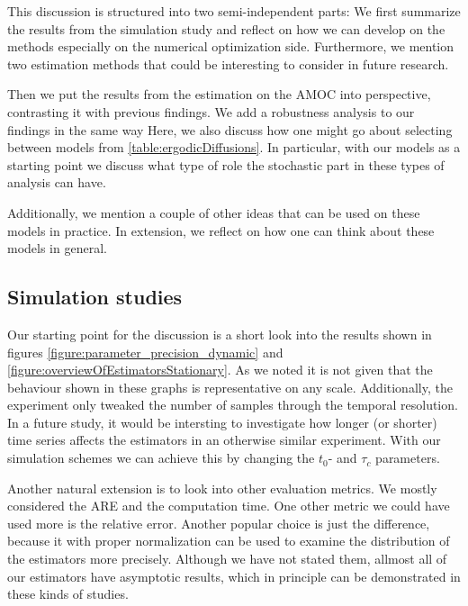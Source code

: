 This discussion is structured into two semi-independent parts: We first summarize the results from the simulation study and reflect on how we can develop on the methods especially on the numerical optimization side. Furthermore, we mention two estimation methods that could be interesting to consider in future research.

Then we put the results from the estimation on the AMOC into perspective, contrasting it with previous findings. We add a robustness analysis to our findings in the same way  Here, we also discuss how one might go about selecting between models from \ref{table:ergodicDiffusions}. In particular, with our models as a starting point we discuss what type of role the stochastic part in these types of analysis can have. 

Additionally, we mention a couple of other ideas that can be used on these models in practice. In extension, we reflect on how one can think about these models in general.
\subsection{Simulation studies}
Our starting point for the discussion is a short look into the results shown in figures \ref{figure:parameter_precision_dynamic} and \ref{figure:overviewOfEstimatorsStationary}. As we noted it is not given that the behaviour shown in these graphs is representative on any scale. Additionally, the experiment only tweaked the number of samples through the temporal resolution. In a future study, it would be intersting to investigate how longer (or shorter) time series affects the estimators in an otherwise similar experiment. With our simulation schemes we can achieve this by changing the $t_0$- and $\tau_c$ parameters.

Another natural extension is to look into other evaluation metrics. We mostly considered the ARE and the computation time. One other metric we could have used more is the relative error. Another popular choice is just the difference, because it with proper normalization can be used to examine the distribution of the estimators more precisely. Although we have not stated them, allmost all of our estimators have asymptotic results, which in principle can be demonstrated in these kinds of studies.

